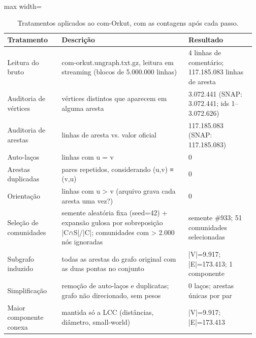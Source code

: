 \begin{table}[!htb]
\centering
\caption{Tratamentos aplicados ao com-Orkut, com as contagens após cada passo.}
\label{tab:tratamentos}
\begin{adjustbox}{max width=\linewidth}
\begin{tabular}{p{3.2cm}p{8.6cm}p{5.2cm}}
\toprule
Tratamento & Descrição & Resultado \\
\midrule
Leitura do bruto & com-orkut.ungraph.txt.gz, leitura em streaming (blocos de 5.000.000 linhas) & 4 linhas de comentário; 117.185.083 linhas de aresta \\
Auditoria de vértices & vértices distintos que aparecem em alguma aresta & 3.072.441 (SNAP: 3.072.441; ids 1–3.072.626) \\
Auditoria de arestas & linhas de aresta vs. valor oficial & 117.185.083 (SNAP: 117.185.083) \\
Auto-laços & linhas com u = v & 0 \\
Arestas duplicadas & pares repetidos, considerando (u,v) ≡ (v,u) & 0 \\
Orientação & linhas com u > v (arquivo grava cada aresta uma vez?) & 0 \\
Seleção de comunidades & semente aleatória fixa (seed=42) + expansão gulosa por sobreposição |C∩S|/|C|; comunidades com > 2.000 nós ignoradas & semente \#933; 51 comunidades selecionadas \\
Subgrafo induzido & todas as arestas do grafo original com as duas pontas no conjunto & |V|=9.917; |E|=173.413; 1 componente \\
Simplificação & remoção de auto-laços e duplicatas; grafo não direcionado, sem pesos & 0 laços; arestas únicas por par \\
Maior componente conexa & mantida só a LCC (distâncias, diâmetro, small-world) & |V|=9.917; |E|=173.413 \\
\bottomrule
\end{tabular}
\end{adjustbox}
\end{table}
